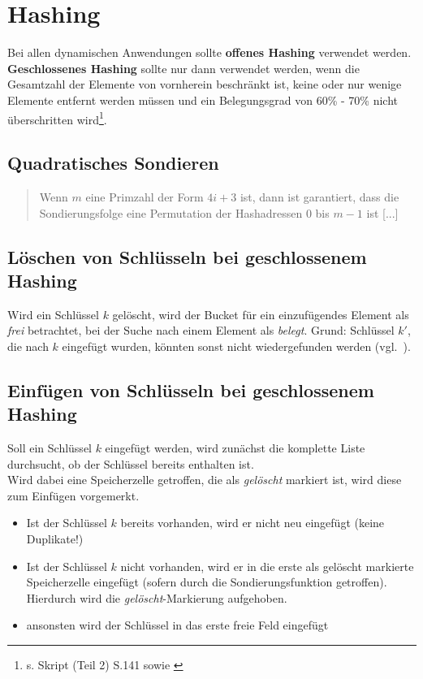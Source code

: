 \section{Hashing}

Bei allen dynamischen Anwendungen sollte \textbf{offenes Hashing} verwendet werden.\\
\textbf{Geschlossenes Hashing} sollte nur dann verwendet werden, wenn die Gesamtzahl der Elemente von vornherein beschränkt ist, keine oder nur wenige Elemente entfernt werden müssen und ein Belegungsgrad von 60\% - 70\% nicht überschritten wird\footnote{s. Skript (Teil 2) S.141 sowie \cite[126]{GD18d}}.

\subsection{Quadratisches Sondieren}

\blockquote[{\cite[207]{OW17d}}]{
Wenn $m$ eine Primzahl der Form $4i+3$ ist, dann ist garantiert, dass die Sondierungsfolge eine Permutation der Hashadressen 0 bis $m-1$ ist [...]
}

\subsection{Löschen von Schlüsseln bei geschlossenem Hashing}
Wird ein Schlüssel $k$ gelöscht, wird der Bucket für ein einzufügendes Element als \textit{frei} betrachtet, bei der Suche nach einem Element als \textit{belegt}. Grund: Schlüssel $k'$, die nach $k$ eingefügt wurden, könnten sonst nicht wiedergefunden werden (vgl.~\cite[203]{OW17d}).\\

\subsection{Einfügen von Schlüsseln bei geschlossenem Hashing}
Soll ein Schlüssel $k$ eingefügt werden, wird zunächst die komplette Liste durchsucht, ob der Schlüssel bereits enthalten ist.\\
Wird dabei eine Speicherzelle getroffen, die als \textit{gelöscht} markiert ist, wird diese zum Einfügen vorgemerkt.\\
\begin{itemize}
    \item Ist der Schlüssel $k$ bereits vorhanden, wird er nicht neu eingefügt (keine Duplikate!)
    \item Ist der Schlüssel $k$ nicht vorhanden, wird er in die erste als gelöscht markierte Speicherzelle eingefügt (sofern durch die Sondierungsfunktion getroffen).
    Hierdurch wird die \textit{gelöscht}-Markierung aufgehoben.
    \item ansonsten wird der Schlüssel in das erste freie Feld eingefügt
\end{itemize}

